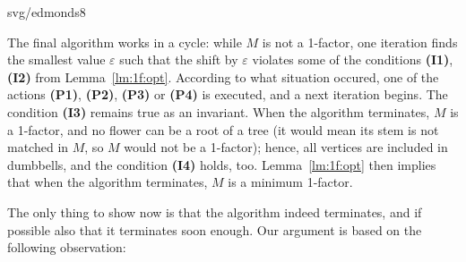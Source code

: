 \begin{myfig}{\textwidth}{svg/edmonds8}
\end{myfig}


\noindent
The final algorithm works in a cycle: while $M$ is not a 1-factor, one iteration finds the smallest
value $\varepsilon$ such that the shift by $\varepsilon$ violates some of the conditions  {\bf(I1)},  {\bf(I2)} 
from Lemma~\ref{lm:1f:opt}. According to what situation occured, one of the actions  {\bf(P1)},  {\bf(P2)}, {\bf(P3)} 
or {\bf(P4)} is executed, and a next iteration begins. The condition {\bf (I3)} remains true as an invariant.
When the algorithm terminates, $M$ is a 1-factor, and no flower can be a root of a tree (it would mean
its stem is not matched in $M$, so $M$ would not be a 1-factor); hence, all vertices are included in dumbbells,
and the condition {\bf (I4)} holds, too. Lemma~\ref{lm:1f:opt} then implies that when the algorithm terminates,
$M$ is a minimum 1-factor.

\noindent
The only thing to show now is that the algorithm indeed terminates, and if possible also that it terminates soon
enough. Our argument is based on the following observation:

